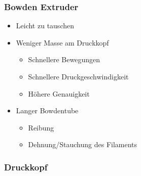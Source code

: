 {
\begin{frame}
  \frametitle{Bowden Extruder}
  \pause
  \begin{itemize}
    \item Leicht zu tauschen \pause
    \item Weniger Masse am Druckkopf
    \begin{itemize}
      \item Schnellere Bewegungen
      \item Schnellere Druckgeschwindigkeit
      \item Höhere Genauigkeit \pause
    \end{itemize}
    \item Langer Bowdentube
    \begin{itemize}
      \item Reibung
      \item Dehnung/Stauchung des Filaments
    \end{itemize}
  \end{itemize}
\end{frame}
}
{
\begin{frame}
  \frametitle{Druckkopf}
\end{frame}
}
